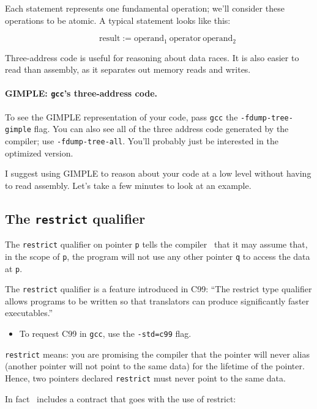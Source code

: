 Each statement represents one fundamental operation; we'll consider
these operations to be atomic. A typical statement looks like this:

\[ \qquad \mbox{result} := \mbox{operand$_1$}\:\mbox{operator}\:\mbox{operand$_2$} \]

Three-address code is useful for reasoning about data races. It is
also easier to read than assembly, as it separates out memory reads
and writes.

\paragraph{GIMPLE: \texttt{gcc}'s three-address code.} To see the GIMPLE representation 
of your code, pass {\tt gcc} the {\tt -fdump-tree-gimple} flag. You
can also see all of the three address code generated by the compiler;
use {\tt -fdump-tree-all}. You'll probably just be interested in the
optimized version.  

I suggest using GIMPLE to reason about your code at a low level
without having to read assembly. Let's take a few minutes to look at an example.


\subsection*{The {\tt restrict} qualifier} 
The {\tt restrict} qualifier on pointer {\tt p} tells
the compiler~\cite{cellperf} that it may assume that, in the scope of {\tt p},
the program will not use any other pointer {\tt q} to access the
data at {\tt *p}.

The {\tt restrict} qualifier is a feature introduced in C99: ``The
restrict type qualifier allows programs to be written so that
translators can produce significantly faster executables.''
  \begin{itemize}
    \item To request C99 in {\tt gcc}, use the {\tt -std=c99} flag.
  \end{itemize}

{\tt restrict} means: you are promising the
compiler that the pointer will never alias (another pointer will not
point to the same data) for the lifetime of the pointer.  Hence, two
pointers declared {\tt restrict} must never point to the same data.

In fact~\cite{cellperf} includes a contract that goes with the use of restrict:

